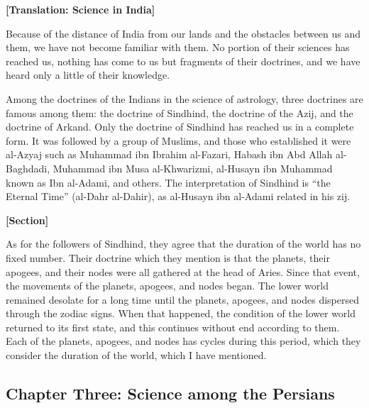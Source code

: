 \documentclass[11pt,a4paper]{article}
\begin{document}
\bigskip

\noindent\textbf{[Translation: Science in India]}

Because of the distance of India from our lands and the obstacles between us and them, we have not become familiar with them. No portion of their sciences has reached us, nothing has come to us but fragments of their doctrines, and we have heard only a little of their knowledge.

Among the doctrines of the Indians in the science of astrology, three doctrines are famous among them: the doctrine of Sindhind, the doctrine of the Azij, and the doctrine of Arkand. Only the doctrine of Sindhind has reached us in a complete form. It was followed by a group of Muslims, and those who established it were al-Azyaj such as Muhammad ibn Ibrahim al-Fazari, Habash ibn Abd Allah al-Baghdadi, Muhammad ibn Musa al-Khwarizmi, al-Husayn ibn Muhammad known as Ibn al-Adami, and others. The interpretation of Sindhind is ``the Eternal Time'' (al-Dahr al-Dahir), as al-Husayn ibn al-Adami related in his zij.

\textbf{[Section]}

As for the followers of Sindhind, they agree that the duration of the world has no fixed number. Their doctrine which they mention is that the planets, their apogees, and their nodes were all gathered at the head of Aries. Since that event, the movements of the planets, apogees, and nodes began. The lower world remained desolate for a long time until the planets, apogees, and nodes dispersed through the zodiac signs. When that happened, the condition of the lower world returned to its first state, and this continues without end according to them. Each of the planets, apogees, and nodes has cycles during this period, which they consider the duration of the world, which I have mentioned.

\clearpage

\subsection*{Chapter Three: Science among the Persians}
\end{document}
